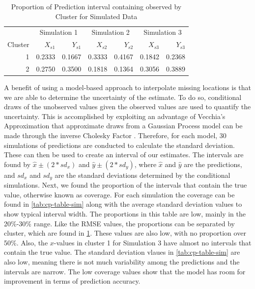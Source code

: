 \documentclass[12pt]{article}
\begin{document}
\begin{table}

\caption{\label{tab:cp-sim-table}Proportion of Prediction interval containing observed by Cluster for Simulated Data}
\centering
\begin{tabular}[t]{rrrrrrr}
\toprule
\multicolumn{1}{c}{ } & \multicolumn{2}{c}{Simulation 1} & \multicolumn{2}{c}{Simulation 2} & \multicolumn{2}{c}{Simulation 3} \\
\cmidrule(l{3pt}r{3pt}){2-3} \cmidrule(l{3pt}r{3pt}){4-5} \cmidrule(l{3pt}r{3pt}){6-7}
Cluster & $X_{s1}$ & $Y_{s1}$ & $X_{s2}$ & $Y_{s2}$ & $X_{s3}$ & $Y_{s3}$\\
\midrule
1 & 0.2333 & 0.1667 & 0.3333 & 0.4167 & 0.1842 & 0.2368\\
2 & 0.2750 & 0.3500 & 0.1818 & 0.1364 & 0.3056 & 0.3889\\
\bottomrule
\end{tabular}
\end{table}

A benefit of using a model-based approach to interpolate missing
locations is that we are able to determine the uncertainty of the
estimate. To do so, conditional draws of the unobserved values given the
observed values are used to quantify the uncertainty. This is
accomplished by exploiting an advantage of Vecchia's Approximation that
approximate draws from a Gaussian Process model can be made through the
inverse Cholesky Factor \citep{guinness_permutation_2018}. Therefore,
for each model, 30 simulations of predictions are conducted to calculate
the standard deviation. These can then be used to create an interval of
our estimates. The intervals are found by \(\hat{x} \pm (2*sd_x)\) and
\(\hat{y} \pm (2*sd_y)\), where \(\hat{x}\) and \(\hat{y}\) are the
predictions, and \(sd_x\) and \(sd_y\) are the standard deviations
determined by the conditional simulations. Next, we found the proportion
of the intervals that contain the true value, otherwise known as
coverage. For each simulation the coverage can be found in
\cref{tab:cp-table-sim} along with the average standard deviation values
to show typical interval width. The proportions in this table are low,
mainly in the 20\%-30\% range. Like the RMSE values, the proportions can
be separated by cluster, which are found in \cref{tab:cp-sim-table}.
These values are also low, with no proportion over 50\%. Also, the
\(x\)-values in cluster 1 for Simulation 3 have almost no intervals that
contain the true value. The standard deviation vlaues in
\cref{tab:cp-table-sim} are also low, meaning there is not much
variability among the predictions and the intervals are narrow. The low
coverage values show that the model has room for improvement in terms of
prediction accuracy.
\end{document}
